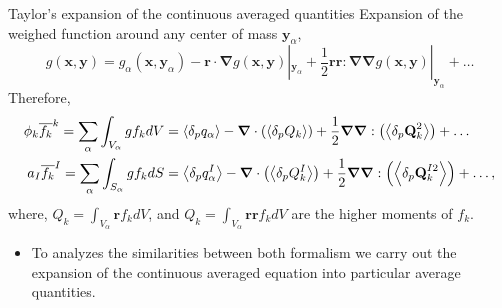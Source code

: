 \documentclass{sintefbeamer}
\newcommand{\nablab}{\bm{\nabla}}
\begin{document}
\begin{frame}{Taylor's expansion of the continuous averaged quantities}
Expansion of the weighed function around any center of mass $\textbf{y}_\alpha$,
\begin{equation*}
    g(\textbf{x},\textbf{y})
    = g_\alpha(\textbf{x},\textbf{y}_\alpha)
    - \textbf{r} \cdot \nablab g(\textbf{x},\textbf{y})|_{\textbf{y}_\alpha}
    + \frac{1}{2} \textbf{r}\textbf{r} : \nablab\nablab g(\textbf{x},\textbf{y})|_{\textbf{y}_\alpha}
    + \ldots
\end{equation*} 
Therefore,
\begin{align*}
  \phi_k \kavg{f_k} = \sum_\alpha \int_{V_\alpha} g f_k dV 
  &=  \pavg{q_\alpha}        
      - \nablab \cdot  \left
      (\pavg{Q_k}\right)        
      + \frac{1}{2} \nablab\nablab : \left(\pavg{\textbf{Q}_k^2}\right)
      + \ldots  \\
  a_I \Iavg{f_k} = \sum_\alpha \int_{S_\alpha} g f_k dS 
  &=  \pavg{q_\alpha^I}        
      - \nablab \cdot  \left(\pavg{Q_k^I}\right)        
      + \frac{1}{2} \nablab\nablab : \left(\pavg{\textbf{Q}_k^{I2}}\right)
      + \ldots,
\end{align*}  
where, $Q_k = \int_{V_\alpha} \textbf{r} f_k dV$, and $Q_k = \int_{V_\alpha} \textbf{r} \textbf{r} f_k dV$  are the higher moments of $f_k$.
\begin{itemize}
  \item To analyzes the similarities between both formalism we carry out the expansion of the continuous averaged equation into particular average quantities. 
\end{itemize}
\end{frame}
\end{document}
